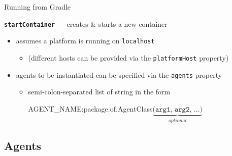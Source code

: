 \documentclass{beamer}\mode<presentation>{\usetheme{AMSCesenaPurpleAndGold}}
\begin{document}
\begin{frame}[allowframebreaks]{Running \jade{} from Gradle}
\begin{block}{\textbf{\texttt{startContainer}} --- creates \& starts a new container}
\begin{itemize}
            \item assumes a platform is running on \texttt{localhost}
            \begin{itemize}
                \item (different hosts can be provided via the \texttt{platformHost} property)
            \end{itemize}

            \item agents to be instantiated can be specified via the \alert{\texttt{agents}} property
            \begin{itemize}
                \item semi-colon-separated list of string in the form
                \begin{center}\ttfamily
                    AGENT\_NAME\alert{:}package.of.AgentClass$\underbrace{\texttt{(arg1, arg2, \ldots)}}_{optional}$
                \end{center}
            \end{itemize}
        \end{itemize}
    \end{block}
\end{frame}

\subsection{\jade{} Agents}
\end{document}
